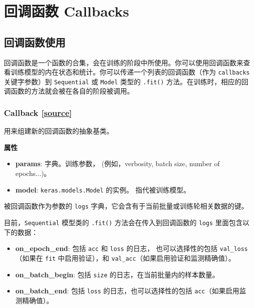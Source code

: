 \section{回调函数 Callbacks}\label{callbacks}
\subsection{回调函数使用}

回调函数是一个函数的合集，会在训练的阶段中所使用。你可以使用回调函数来查看训练模型的内在状态和统计。你可以传递一个列表的回调函数（作为
\texttt{callbacks} 关键字参数）到 \texttt{Sequential} 或 \texttt{Model}
类型的 \texttt{.fit()}
方法。在训练时，相应的回调函数的方法就会被在各自的阶段被调用。



\subsubsection{Callback {\href{https://github.com/keras-team/keras/blob/master/keras/callbacks.py\#L145}{{[}source{]}}}}

\begin{Shaded}
\begin{Highlighting}[]
\end{Highlighting}
\end{Shaded}

用来组建新的回调函数的抽象基类。

\textbf{属性}

\begin{itemize}
\tightlist
\item
  \textbf{params}: 字典。训练参数， (例如，verbosity, batch size, number
  of epochs...)。
\item
  \textbf{model}: \texttt{keras.models.Model} 的实例。 指代被训练模型。
\end{itemize}

被回调函数作为参数的 \texttt{logs}
字典，它会含有于当前批量或训练轮相关数据的键。

目前，\texttt{Sequential} 模型类的 \texttt{.fit()}
方法会在传入到回调函数的 \texttt{logs} 里面包含以下的数据：

\begin{itemize}
\tightlist
\item
  \textbf{on\_epoch\_end}: 包括 \texttt{acc} 和 \texttt{loss} 的日志，
  也可以选择性的包括 \texttt{val\_loss}（如果在 \texttt{fit}
  中启用验证），和 \texttt{val\_acc}（如果启用验证和监测精确值）。
\item
  \textbf{on\_batch\_begin}: 包括 \texttt{size}
  的日志，在当前批量内的样本数量。
\item
  \textbf{on\_batch\_end}: 包括 \texttt{loss} 的日志，也可以选择性的包括
  \texttt{acc}（如果启用监测精确值）。
\end{itemize}




